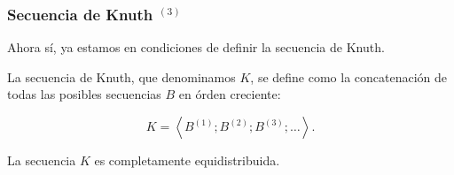 \documentclass[t, 10pt, mathserif]{beamer}
\begin{document}

\begin{frame}
  \frametitle{Secuencia de Knuth {$^{(3)}$}}

  Ahora sí, ya estamos en condiciones de definir la secuencia de Knuth.
  \pause

  \medskip
  \begin{definition}
    La secuencia de Knuth, que denominamos $K$, se define como la concatenación de todas las posibles secuencias $B$ en órden creciente:
    \pause

    \begin{equation*}
      K = \left< B^{(1)} ; B^{(2)} ;  B^{(3)} ; \dots \right> \text{.}
    \end{equation*}
  \end{definition}
  \pause

  \medskip
  \begin{theorem}
    \medskip
    La secuencia $K$ es completamente equidistribuida.
  \end{theorem}
\end{frame}

\end{document}
